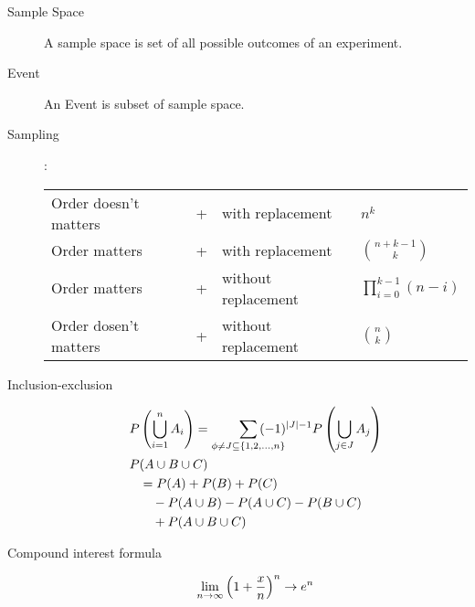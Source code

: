 \begin{slide}[Basics]
\begin{description}
	\item[Sample Space] A sample space is set of all possible outcomes of an experiment. 
	\item[Event] An Event is subset of sample space.
	\item[Sampling]:\newline
		\begin{tabular}{lcll}
			Order doesn't matters& + &with replacement& $n^k$\\
			Order matters& + &with replacement& ${n+k-1\choose k}$\\
			Order matters& + &without replacement& $ \prod\limits_{i=0}^{k-1}(n-i)$\\
			Order dosen't matters& + &without replacement& ${n\choose k}$
		\end{tabular}
\end{description}
\end{slide}


\begin{slidemaximus}


\begin{description}
\item[Inclusion-exclusion]
\begin{align*}
P&\left(\bigcup_{i=1}^{n} A_i\right) =\sum_{\phi\neq J\subseteq\{1,2,\ldots,n\}}\hspace{-20pt} (-1)^{|J|-1}P\left(\bigcup_{j\in J}A_j\right)\\
  P&(A\cup B\cup C)\\ &=  P(A) + P(B) + P(C)\\
                           &\quad- P(A\cup B) - P(A\cup C) - P(B\cup C)\\
			   &\quad+ P(A\cup B\cup C)  
\end{align*}

\item[Compound interest formula]$$\lim_{n\to\infty}\left(1+{x\over n}\right)^n  \to e^n$$
\end{description}
\end{slidemaximus}
